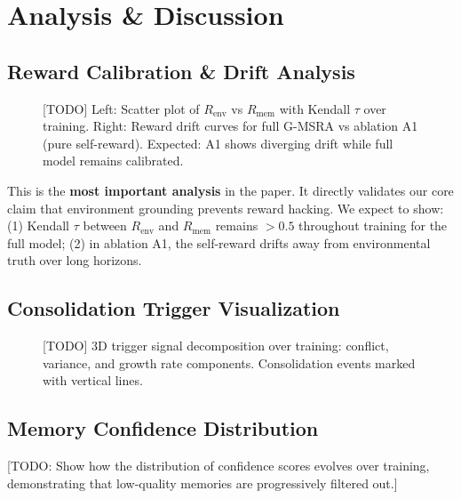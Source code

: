 \documentclass{article}
\newcommand{\gmsra}{\textsc{G-MSRA}}
\newcommand{\renv}{R_{\mathrm{env}}}
\newcommand{\rmem}{R_{\mathrm{mem}}}
\begin{document}
\section{Analysis \& Discussion}
\label{sec:analysis}

\subsection{Reward Calibration \& Drift Analysis}

\begin{figure}[h]
\centering
\caption{[TODO] Left: Scatter plot of $\renv$ vs $\rmem$ with Kendall $\tau$ over training. Right: Reward drift curves for full \gmsra{} vs ablation A1 (pure self-reward). Expected: A1 shows diverging drift while full model remains calibrated.}
\label{fig:reward_analysis}
\end{figure}

This is the \textbf{most important analysis} in the paper. It directly validates our core claim that environment grounding prevents reward hacking. We expect to show: (1) Kendall $\tau$ between $\renv$ and $\rmem$ remains $>0.5$ throughout training for the full model; (2) in ablation A1, the self-reward drifts away from environmental truth over long horizons.

\subsection{Consolidation Trigger Visualization}

\begin{figure}[h]
\centering
\caption{[TODO] 3D trigger signal decomposition over training: conflict, variance, and growth rate components. Consolidation events marked with vertical lines.}
\label{fig:trigger}
\end{figure}

\subsection{Memory Confidence Distribution}

[TODO: Show how the distribution of confidence scores evolves over training, demonstrating that low-quality memories are progressively filtered out.]
\end{document}
